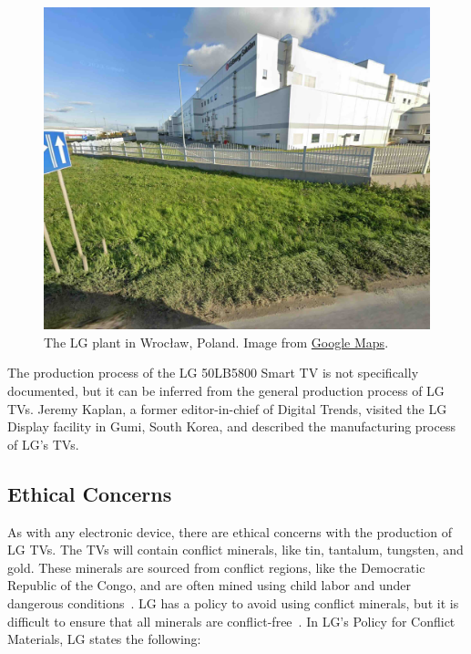 \documentclass[12pt, letterpaper]{article}
\newcommand\todo[1]{{\color{red}{\footnotesize[TODO: #1]}}} %
\begin{document}
\begin{figure}[H]
  \medskip
  \centering
  \includegraphics[width=1\linewidth]{lgensol-wroclaw-google-maps}
  \caption{The LG plant in Wrocław, Poland. Image from
  \href{https://maps.app.goo.gl/vMukYzKtPBX12RGo9}{Google Maps}.}
  \medskip
  \label{fig:lgensol-wroclaw-google-maps}
\end{figure}

The production process of the LG 50LB5800 Smart TV is not
specifically documented, but it can be inferred from the general
production process of LG TVs. Jeremy Kaplan, a former editor-in-chief of
Digital Trends, visited the LG Display facility in Gumi, South Korea,
and described the manufacturing process of LG's TVs.

\todo{Explain the general production process of LG TVs.}

\subsection{Ethical Concerns}

As with any electronic device, there are ethical concerns with the
production of LG TVs. The TVs will contain conflict minerals, like
tin, tantalum, tungsten, and gold. These minerals are sourced from
conflict regions, like the Democratic
Republic of the Congo, and are often mined using child labor and
under dangerous conditions~\autocite{hower-2013}. LG has a policy to
avoid using conflict
minerals, but it is difficult to ensure that all minerals are
conflict-free~\autocite{lg-electronics-no-date}. In LG's Policy for
Conflict Materials, LG states the following:
\end{document}
